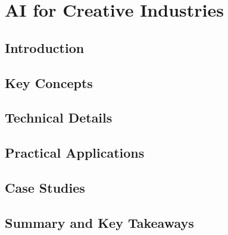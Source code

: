 ﻿%

\chapter{AI for Creative Industries}
\label{ch:chapter-22}

\section{Introduction}


\section{Key Concepts}


\section{Technical Details}


\section{Practical Applications}


\section{Case Studies}


\section{Summary and Key Takeaways}


